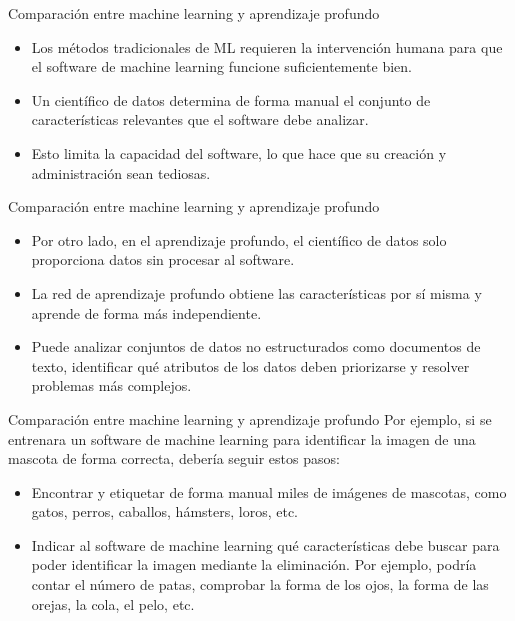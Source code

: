 \documentclass[11pt,aspectratio=169]{beamer}
\begin{document}
\begin{frame}{Comparación entre machine learning y aprendizaje profundo}
	\begin{itemize}
		\item Los métodos tradicionales de ML requieren la intervención humana para que el software de machine learning 
			funcione suficientemente bien.\pause 
		\item Un científico de datos determina de forma manual el conjunto de características relevantes que el software 
			debe analizar.\pause 
		\item Esto limita la capacidad del software, lo que hace que su creación y administración sean tediosas.
	\end{itemize}
\end{frame}

\begin{frame}{Comparación entre machine learning y aprendizaje profundo}
	\begin{itemize}
		\item Por otro lado, en el aprendizaje profundo, el científico de datos solo proporciona datos sin procesar al 
			software.\pause 
		\item La red de aprendizaje profundo obtiene las características por sí misma y aprende de forma más independiente.\pause
		\item Puede analizar conjuntos de datos no estructurados como documentos de texto, identificar qué atributos de los 
			datos deben priorizarse y resolver problemas más complejos.
	\end{itemize}
\end{frame}

\begin{frame}{Comparación entre machine learning y aprendizaje profundo}
	Por ejemplo, si se entrenara un software de machine learning para identificar la imagen de una mascota de forma correcta, 
	debería seguir estos pasos:\pause

	\begin{itemize}
		\item Encontrar y etiquetar de forma manual miles de imágenes de mascotas, como gatos, perros, caballos, hámsters, loros, etc.\pause
		\item Indicar al software de machine learning qué características debe buscar para poder identificar la imagen mediante la eliminación. 
			Por ejemplo, podría contar el número de patas, comprobar la forma de los ojos, la forma de las orejas, la cola, el pelo, etc.
	\end{itemize}	
\end{frame}
\end{document}
